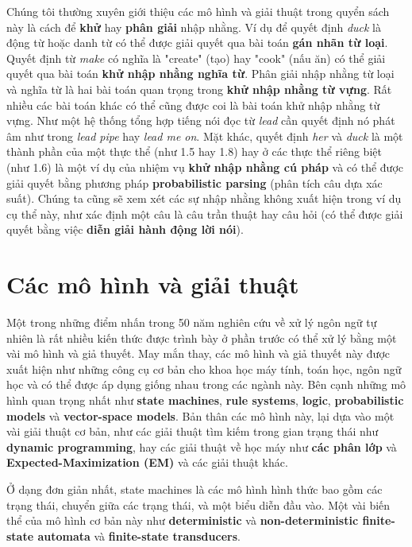 Chúng tôi thường xuyên giới thiệu các mô hình và giải thuật trong quyển sách này là cách để \textbf{khử} hay \textbf{phân giải} nhập nhằng. Ví dụ để quyết định \textit{duck} là động từ hoặc danh từ có thể được giải quyết qua bài toán \textbf{gán nhãn từ loại}. Quyết định từ \textit{make} có nghĩa là "create" (tạo) hay "cook" (nấu ăn) có thể giải quyết qua bài toán \textbf{khử nhập nhằng nghĩa từ}. Phân giải nhập nhằng từ loại và nghĩa từ là hai bài toán quan trọng trong \textbf{khử nhập nhằng từ vựng}. Rất nhiều các bài toán khác có thể cũng được coi là bài toán khử nhập nhằng từ vựng. Như một hệ thống tổng hợp tiếng nói đọc từ \textit{lead} cần quyết định nó phát âm như trong \textit{lead pipe} hay \textit{lead me on}. Mặt khác, quyết định \textit{her} và \textit{duck} là một thành phần của một thực thể (như 1.5 hay 1.8) hay ở các thực thể riêng biệt (như 1.6) là một ví dụ của nhiệm vụ \textbf{khử nhập nhằng cú pháp} và có thể được giải quyết bằng phương pháp \textbf{probabilistic parsing} (phân tích câu dựa xác suất). Chúng ta cũng sẽ xem xét các sự nhập nhằng không xuất hiện trong ví dụ cụ thể này, như xác định một câu là câu trần thuật hay câu hỏi (có thể được giải quyết bằng việc \textbf{diễn giải hành động lời nói}).

\section{Các mô hình và giải thuật}

Một trong những điểm nhấn trong 50 năm nghiên cứu về xử lý ngôn ngữ tự nhiên là rất nhiều kiến thức được trình bày ở phần trước có thể xử lý bằng một vài mô hình và giả thuyết. May mắn thay, các mô hình và giả thuyết này được xuất hiện như những công cụ cơ bản cho khoa học máy tính, toán học, ngôn ngữ học và có thể được áp dụng giống nhau trong các ngành này. Bên cạnh những mô hình quan trọng nhất như \textbf{state machines}, \textbf{rule systems}, \textbf{logic}, \textbf{probabilistic models} và \textbf{vector-space models}. Bản thân các mô hình này, lại dựa vào một vài giải thuật cơ bản, như các giải thuật tìm kiếm trong gian trạng thái như \textbf{dynamic programming}, hay các giải thuật về học máy như \textbf{các phân lớp} và \textbf{Expected-Maximization (EM)} và các giải thuật khác.

Ở dạng đơn giản nhất, state machines là các mô hình hình thức bao gồm các trạng thái, chuyển giữa các trạng thái, và một biểu diễn đầu vào. Một vài biến thể của mô hình cơ bản này như \textbf{deterministic} và \textbf{non-deterministic finite-state automata} và \textbf{finite-state transducers}.

